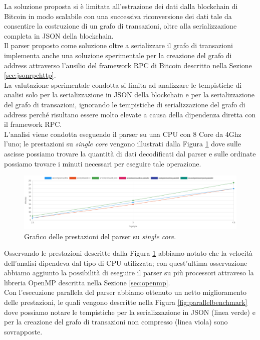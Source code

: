 La soluzione proposta si è limitata all'estrazione dei dati dalla blockchain di Bitcoin in modo scalabile con una successiva riconversione dei dati tale da consentire la costruzione di un grafo di transazioni, oltre alla serializzazione completa in JSON della blockchain.\\
Il parser proposto come soluzione oltre a serializzare il grafo di transazioni implementa anche una soluzione sperimentale per la creazione del grafo di address attraverso l'ausilio del framework RPC di Bitcoin descritto nella Sezione \ref{sec:jsonrpchttp}.\\
La valutazione sperimentale condotta si limita ad analizzare le tempistiche di analisi solo per la serializzazione in JSON della blockchain e per la serializzazione del grafo di transazioni, ignorando le tempistiche di serializzazione del grafo di address perché risultano essere molto elevate a causa della dipendenza diretta con il framework RPC.\\
L'analisi viene condotta eseguendo il parser su una CPU  con 8 Core da 4Ghz l'uno; le prestazioni su \emph{single core} vengono illustrati dalla Figura \ref{fig:noparallelbenchmark} dove sulle ascisse possiamo trovare la quantità di dati decodificati dal parser e sulle ordinate possiamo trovare i minuti necessari per eseguire tale operazione.
\begin{figure}[H]
\centering
 \includegraphics[scale=0.2]{images/demo/no_paralel_benckmark.png}
 \caption{Grafico delle prestazioni del parser su \emph{single core}.}\label{fig:noparallelbenchmark}
\end{figure}
Osservando le prestazioni descritte dalla Figura \ref{fig:noparallelbenchmark} abbiamo notato che la velocità dell'analisi dipendeva dal tipo di CPU utilizzata; con quest'ultima osservazione abbiamo aggiunto la possibilità di eseguire il parser su più processori attraveso la libreria OpenMP descritta nella Sezione \ref{sec:openmp}.\\
Con l'esecuzione parallela del parser abbiamo ottenuto un netto miglioramento delle prestazioni, le quali vengono descritte nella Figura \ref{fig:parallelbenchmark} dove possiamo notare le tempistiche per la serializzazione in JSON (linea verde) e per la creazione del grafo di transazioni non compresso (linea viola) sono sovrapposte.\\

